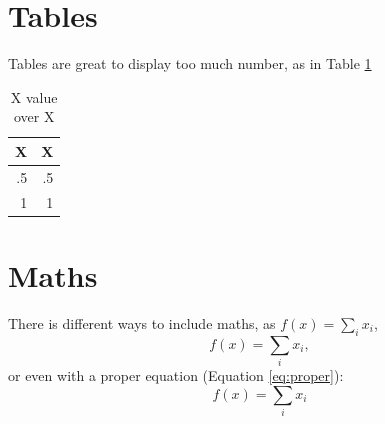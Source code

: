     \section{Tables}
        Tables are great to display too much number, as in Table \ref{tab:supertable}

        \begin{table}[h]
            \centering
            \begin{tabular}{|r|r|}
                \hline
                X & X \\
                \hline
                .5 & .5 \\
                \hline
                1 & 1 \\
                \hline
            \end{tabular}
            \label{tab:supertable}
            \caption{X value over X}
        \end{table}

    \section{Maths}
        There is different ways to include maths, as $f(x) = \sum_i x_i$, \[ f(x) = \sum_i x_i, \] or even with a proper equation (Equation \eqref{eq:proper}):
        \begin{equation}
            \label{eq:proper}
            f(x) = \sum_i x_i
        \end{equation}